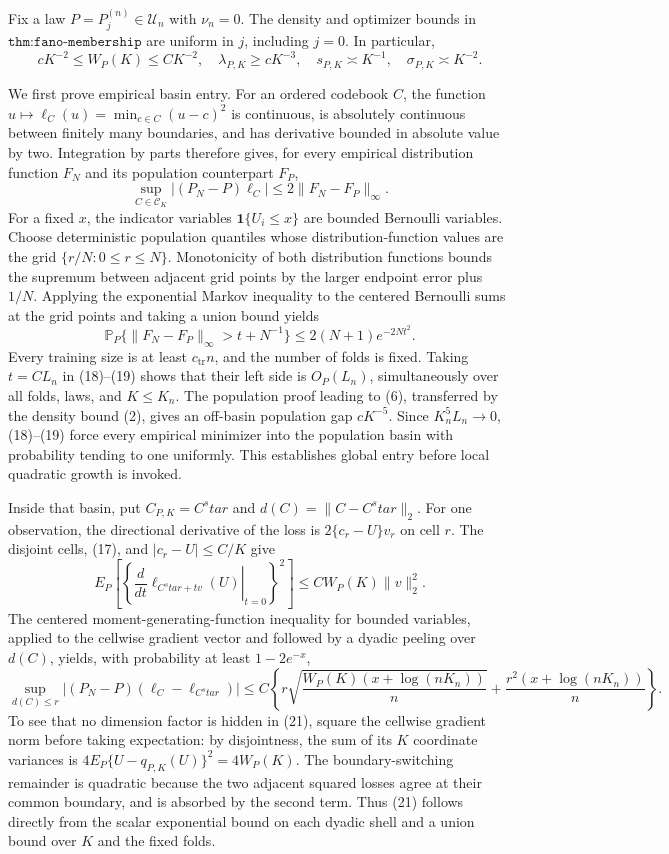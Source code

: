 Fix a law \(P=P_j^{(n)}\in\mathcal U_n\) with \(\nu_n=0\).  The density and optimizer bounds in \(\texttt{thm:fano-membership}\) are uniform in \(j\), including \(j=0\).  In particular,
\[
 cK^{-2}\leq W_P(K)\leq CK^{-2},\quad
 \lambda_{P,K}\geq cK^{-3},\quad s_{P,K}\asymp K^{-1},\quad
 \sigma_{P,K}\asymp K^{-2}. \tag{17}
\]

We first prove empirical basin entry.  For an ordered codebook \(C\), the function \(u\mapsto\ell_C(u)=\min_{c\in C}(u-c)^2\) is continuous, is absolutely continuous between finitely many boundaries, and has derivative bounded in absolute value by two.  Integration by parts therefore gives, for every empirical distribution function \(F_N\) and its population counterpart \(F_P\),
\[
 \sup_{C\in\mathcal C_K}|(P_N-P)\ell_C|
 \leq2\|F_N-F_P\|_\infty. \tag{18}
\]
For a fixed \(x\), the indicator variables \(\mathbf1\{U_i\leq x\}\) are bounded Bernoulli variables.  Choose deterministic population quantiles whose distribution-function values are the grid \(\{r/N:0\leq r\leq N\}\).  Monotonicity of both distribution functions bounds the supremum between adjacent grid points by the larger endpoint error plus \(1/N\).  Applying the exponential Markov inequality to the centered Bernoulli sums at the grid points and taking a union bound yields
\[
 \mathbb P_P\{\|F_N-F_P\|_\infty>t+N^{-1}\}\leq2(N+1)e^{-2Nt^2}. \tag{19}
\]
Every training size is at least \(c_{\mathrm{tr}}n\), and the number of folds is fixed.  Taking \(t=C L_n\) in (18)--(19) shows that their left side is \(O_P(L_n)\), simultaneously over all folds, laws, and \(K\leq K_n\).  The population proof leading to (6), transferred by the density bound (2), gives an off-basin population gap \(cK^{-5}\).  Since \(K_n^5L_n\to0\), (18)--(19) force every empirical minimizer into the population basin with probability tending to one uniformly.  This establishes global entry before local quadratic growth is invoked.

Inside that basin, put \(C_{P,K}=C^star\) and \(d(C)=\|C-C^star\|_2\).  For one observation, the directional derivative of the loss is \(2\{c_r-U\}v_r\) on cell \(r\).  The disjoint cells, (17), and \(|c_r-U|\leq C/K\) give
\[
 E_P\left[\left\{\left.\frac d{dt}\ell_{C^star+tv}(U)\right|_{t=0}\right\}^2\right]
 \leq CW_P(K)\|v\|_2^2. \tag{20}
\]
The centered moment-generating-function inequality for bounded variables, applied to the cellwise gradient vector and followed by a dyadic peeling over \(d(C)\), yields, with probability at least \(1-2e^{-x}\),
\[
 \sup_{d(C)\leq r}|(P_N-P)(\ell_C-\ell_{C^star})|
 \leq C\left\{r\sqrt{\frac{W_P(K)(x+\log(nK_n))}{n}}
 +\frac{r^2(x+\log(nK_n))}{n}\right\}. \tag{21}
\]
To see that no dimension factor is hidden in (21), square the cellwise gradient norm before taking expectation: by disjointness, the sum of its \(K\) coordinate variances is \(4E_P\{U-q_{P,K}(U)\}^2=4W_P(K)\).  The boundary-switching remainder is quadratic because the two adjacent squared losses agree at their common boundary, and is absorbed by the second term.  Thus (21) follows directly from the scalar exponential bound on each dyadic shell and a union bound over \(K\) and the fixed folds.

